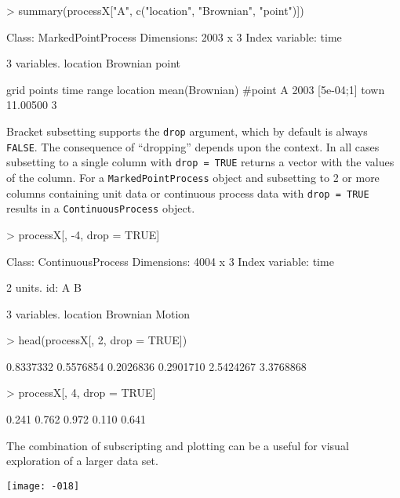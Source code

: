\documentclass[11pt,a4paper,twoside]{article}
\begin{document}
\begin{Schunk}
\begin{Sinput}
> summary(processX["A", c("location", "Brownian", "point")])
\end{Sinput}
\begin{Soutput}
Class: MarkedPointProcess 
Dimensions: 2003 x 3 
Index variable: time 

3 variables.
   location Brownian point

  grid points time range location mean(Brownian) #point
A        2003  [5e-04;1]     town       11.00500      3
\end{Soutput}
\end{Schunk}

Bracket subsetting supports the \verb+drop+ argument, which by
default is always \verb+FALSE+. The consequence of ``dropping''
depends upon the context. In all cases subsetting to a single column
with \verb+drop = TRUE+ returns a vector with the values of the
column.  For a \verb+MarkedPointProcess+ object and subsetting to
2 or more columns containing unit data or
continuous process data with \verb+drop = TRUE+ results in a 
\verb+ContinuousProcess+ object. 

\begin{Schunk}
\begin{Sinput}
> processX[, -4, drop = TRUE]
\end{Sinput}
\begin{Soutput}
Class: ContinuousProcess 
Dimensions: 4004 x 3 
Index variable: time 

2 units.
   id: A B

3 variables.
   location Brownian Motion
\end{Soutput}
\begin{Sinput}
> head(processX[, 2, drop = TRUE])
\end{Sinput}
\begin{Soutput}
[1] 0.8337332 0.5576854 0.2026836 0.2901710 2.5424267 3.3768868
\end{Soutput}
\begin{Sinput}
> processX[, 4, drop = TRUE]
\end{Sinput}
\begin{Soutput}
[1] 0.241 0.762 0.972 0.110 0.641
\end{Soutput}
\end{Schunk}

The combination of subscripting and plotting can be a useful 
for visual exploration of a larger data set. 

\texttt{[image: -018]}
\end{document}
